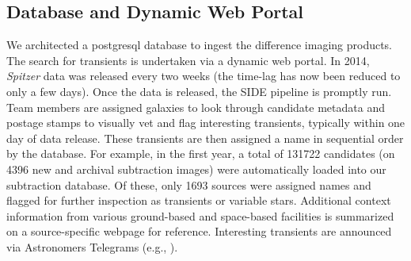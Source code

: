 \documentclass[twocolumn,times]{aastex6}
\begin{document}
\subsection{Database and Dynamic Web Portal}
We architected a postgresql database to ingest the difference imaging products.  The search for transients is  
undertaken via a dynamic web portal. In 2014, {\it Spitzer} data was released every two weeks (the time-lag has now been reduced
to only a few days). Once the data is released, the SIDE pipeline is promptly run. 
Team members are assigned galaxies to look through candidate metadata and postage stamps to visually vet and flag interesting transients, typically within one day of data release. These transients are then assigned a name in sequential order by the database. For example, in the first year, 
a total of 131722 candidates (on 4396 new and archival subtraction images) were automatically loaded into our subtraction database. Of these, only 1693 
sources were assigned names and flagged for further inspection as transients or variable stars. Additional context information from various 
ground-based and space-based facilities is summarized on a source-specific webpage for reference. Interesting transients are announced via Astronomers
Telegrams (e.g., \citealt{ATEL1,ATEL2,ATEL3,ATEL4}).
\end{document}
